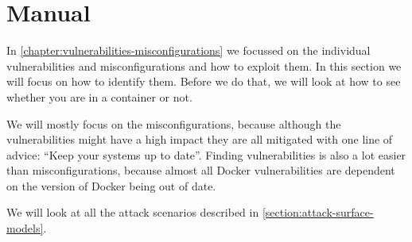 \section{Manual}

In \autoref{chapter:vulnerabilities-misconfigurations} we focussed on the individual vulnerabilities and misconfigurations and how to exploit them. In this section we will focus on how to identify them. Before we do that, we will look at how to see whether you are in a container or not.

We will mostly focus on the misconfigurations, because although the vulnerabilities might have a high impact they are all mitigated with one line of advice: ``Keep your systems up to date''. Finding vulnerabilities is also a lot easier than misconfigurations, because almost all Docker vulnerabilities are dependent on the version of Docker being out of date.

We will look at all the attack scenarios described in \autoref{section:attack-surface-models}.





